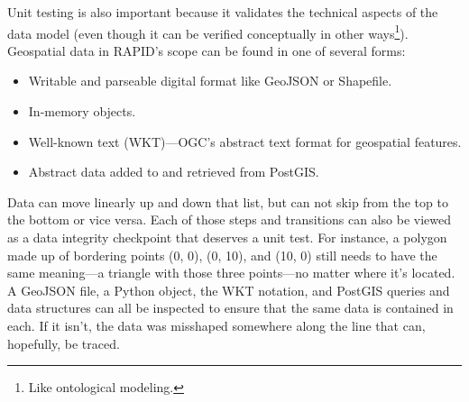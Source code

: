 Unit testing is also important because it validates the technical aspects of the data model (even though it can be verified conceptually in other ways\footnote{Like ontological modeling.}). Geospatial data in RAPID's scope can be found in one of several forms:

\begin{itemize}
\item Writable and parseable digital format like GeoJSON or Shapefile.
\item In-memory objects.
\item Well-known text (WKT)---OGC's abstract text format for geospatial features.
\item Abstract data added to and retrieved from PostGIS.
\end{itemize}

Data can move linearly up and down that list, but can not skip from the top to the bottom or vice versa. Each of those steps and transitions can also be viewed as a data integrity checkpoint that deserves a unit test. For instance, a polygon made up of bordering points (0, 0), (0, 10), and (10, 0) still needs to have the same meaning---a triangle with those three points---no matter where it's located. A GeoJSON file, a Python object, the WKT notation, and PostGIS queries and data structures can all be inspected to ensure that the same data is contained in each. If it isn't, the data was misshaped somewhere along the line that can, hopefully, be traced.


